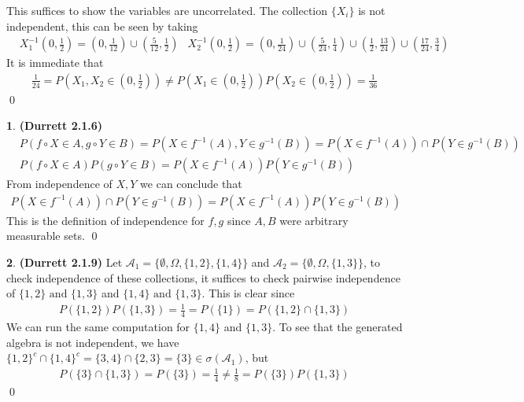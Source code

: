 \documentclass[10.5pt]{article}
\theoremstyle{definition}
\newtheorem{pb}{}
\newcommand{\set}[1]{\{#1\}}
\newcommand{\tand}{\text{ and }}
\begin{document}
    This suffices to show the variables are uncorrelated. The collection \(\set{X_i}\) is not independent, this can be seen by taking
    \begin{align*}
        &X_1^{-1}(0,\frac12) = (0,\frac{1}{12}) \cup (\frac{5}{12},\frac12) &X_2^{-1}(0,\frac{1}{2}) = (0,\frac{1}{24})\cup(\frac{5}{24},\frac14)\cup(\frac12,\frac{13}{24})\cup(\frac{17}{24},\frac34)
    \end{align*}
    It is immediate that
    \begin{align*}
        \frac{1}{24} = P\left(X_1,X_2 \in (0,\frac12)\right) \neq P\left(X_1 \in (0,\frac12)\right)P\left(X_2 \in (0,\frac12)\right) = \frac{1}{36}
    \end{align*}\qed

    \begin{pb}\textbf{(Durrett 2.1.6)}
        \begin{align*}
            &P(f\circ X \in A, g\circ Y \in B) = P(X \in f^{-1}(A), Y \in g^{-1}(B)) = P(X \in f^{-1}(A)) \cap P(Y \in g^{-1}(B)) \\
            &P(f\circ X \in A)P(g\circ Y \in B) = P(X \in f^{-1}(A))P(Y \in g^{-1}(B))
        \end{align*}
        From independence of \(X,Y\) we can conclude that
        \begin{align*}
            P(X \in f^{-1}(A)) \cap P(Y \in g^{-1}(B)) = P(X \in f^{-1}(A))P(Y \in g^{-1}(B))
        \end{align*}
        This is the definition of independence for \(f,g\) since \(A,B\) were arbitrary measurable sets. \qed
    \end{pb}
    \begin{pb}\textbf{(Durrett 2.1.9)}
        Let \(\mathcal{A}_1 = \set{\emptyset,\Omega,\set{1,2},\set{1,4}}\) and \(\mathcal{A}_2 = \set{\emptyset,\Omega,\set{1,3}}\), to check independence of these collections, it suffices to check pairwise independence of \(\set{1,2} \tand \set{1,3}\) and \(\set{1,4} \tand \set{1,3}\). This is clear since
        \begin{align*}
            P(\set{1,2})P(\set{1,3}) = \frac14 = P(\set{1}) = P(\set{1,2} \cap \set{1,3})
        \end{align*}
        We can run the same computation for \(\set{1,4}\) and \(\set{1,3}\). To see that the generated algebra is not independent, we have \(\set{1,2}^c \cap \set{1,4}^c = \set{3,4} \cap \set{2,3} = \set{3} \in \sigma(\mathcal{A}_1)\), but
        \begin{align*}
            P(\set{3}\cap\set{1,3}) = P(\set{3}) = \frac14 \neq \frac18 = P(\set{3})P(\set{1,3})
        \end{align*} \qed
    \end{pb}
\end{document}
